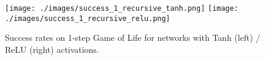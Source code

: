 \documentclass[letterpaper]{article} %
\newcommand{\clr}[1]{\textcolor{Aquamarine}{#1}}
\begin{document}


\begin{figure*}[t]
    \centering
    \texttt{[image: ./images/success\_1\_recursive\_tanh.png]}
    \texttt{[image: ./images/success\_1\_recursive\_relu.png]}
    \caption{Success rates on 1-step Game of Life for networks with Tanh (left) / ReLU (right) activations.}
    \label{fig:1_step_success}
\end{figure*}
\end{document}
